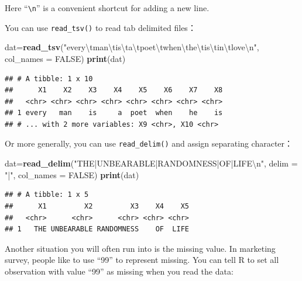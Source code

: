 \documentclass[12pt,]{krantz}
\newenvironment{Shaded}{\begin{snugshade}}{\end{snugshade}}
\newcommand{\KeywordTok}[1]{\textcolor[rgb]{0.13,0.29,0.53}{\textbf{{#1}}}}
\newcommand{\DataTypeTok}[1]{\textcolor[rgb]{0.13,0.29,0.53}{{#1}}}
\newcommand{\CharTok}[1]{\textcolor[rgb]{0.31,0.60,0.02}{{#1}}}
\newcommand{\StringTok}[1]{\textcolor[rgb]{0.31,0.60,0.02}{{#1}}}
\newcommand{\OtherTok}[1]{\textcolor[rgb]{0.56,0.35,0.01}{{#1}}}
\newcommand{\NormalTok}[1]{{#1}}
\theoremstyle{definition}
\theoremstyle{definition}
\theoremstyle{remark}
\begin{document}
Here ``\texttt{\textbackslash{}n}'' is a convenient shortcut for adding
a new line.

You can use \texttt{read\_tsv()} to read tab delimited files：

\begin{Shaded}
\begin{Highlighting}[]
\NormalTok{dat=}\KeywordTok{read_tsv}\NormalTok{(}\StringTok{"every}\CharTok{\textbackslash{}t}\StringTok{man}\CharTok{\textbackslash{}t}\StringTok{is}\CharTok{\textbackslash{}t}\StringTok{a}\CharTok{\textbackslash{}t}\StringTok{poet}\CharTok{\textbackslash{}t}\StringTok{when}\CharTok{\textbackslash{}t}\StringTok{he}\CharTok{\textbackslash{}t}\StringTok{is}\CharTok{\textbackslash{}t}\StringTok{in}\CharTok{\textbackslash{}t}\StringTok{love}\CharTok{\textbackslash{}n}\StringTok{"}\NormalTok{, }\DataTypeTok{col_names =} \OtherTok{FALSE}\NormalTok{)}
\KeywordTok{print}\NormalTok{(dat)}
\end{Highlighting}
\end{Shaded}

\begin{verbatim}
## # A tibble: 1 x 10
##      X1    X2    X3    X4    X5    X6    X7    X8
##   <chr> <chr> <chr> <chr> <chr> <chr> <chr> <chr>
## 1 every   man    is     a  poet  when    he    is
## # ... with 2 more variables: X9 <chr>, X10 <chr>
\end{verbatim}

Or more generally, you can use \texttt{read\_delim()} and assign
separating character：

\begin{Shaded}
\begin{Highlighting}[]
\NormalTok{dat=}\KeywordTok{read_delim}\NormalTok{(}\StringTok{"THE|UNBEARABLE|RANDOMNESS|OF|LIFE}\CharTok{\textbackslash{}n}\StringTok{"}\NormalTok{, }\DataTypeTok{delim =} \StringTok{"|"}\NormalTok{, }\DataTypeTok{col_names =} \OtherTok{FALSE}\NormalTok{)}
\KeywordTok{print}\NormalTok{(dat)}
\end{Highlighting}
\end{Shaded}

\begin{verbatim}
## # A tibble: 1 x 5
##      X1         X2         X3    X4    X5
##   <chr>      <chr>      <chr> <chr> <chr>
## 1   THE UNBEARABLE RANDOMNESS    OF  LIFE
\end{verbatim}

Another situation you will often run into is the missing value. In
marketing survey, people like to use ``99'' to represent missing. You
can tell R to set all observation with value ``99'' as missing when you
read the data:
\end{document}

